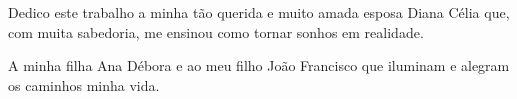 \thispagestyle{empty}%
\null\vfill
\begin{flushright}
Dedico este trabalho a minha t\~{a}o querida e muito amada esposa Diana C\'{e}lia que, com muita sabedoria, me ensinou como tornar sonhos em realidade.

A minha filha Ana D\'{e}bora e ao meu filho Jo\~{a}o Francisco que iluminam e alegram os caminhos minha vida.
\end{flushright}
